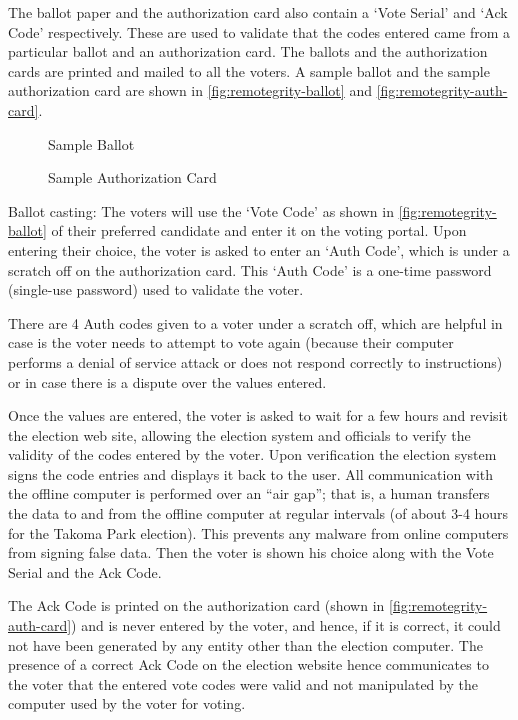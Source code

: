 The ballot paper and the authorization card also contain a `Vote
Serial' and `Ack Code' respectively. These are used to validate that
the codes entered came from a particular ballot and an authorization
card. The ballots and the authorization cards are printed and mailed
to all the voters. A sample ballot and the sample authorization card
are shown in \autoref{fig:remotegrity-ballot} and
\autoref{fig:remotegrity-auth-card}.

\begin{figure}
  \centering {}
  \caption{Sample Ballot}
  \label{fig:remotegrity-ballot}
\end{figure}

\begin{figure}
  \centering {}
  \caption{Sample Authorization Card}
  \label{fig:remotegrity-auth-card}
\end{figure}

Ballot casting: The voters will use the `Vote Code' as shown in
\autoref{fig:remotegrity-ballot} of their preferred candidate and
enter it on the voting portal. Upon entering their choice, the voter
is asked to enter an `Auth Code', which is under a scratch off on the
authorization card. This `Auth Code' is a one-time password
(single-use password) used to validate the voter.

There are 4 Auth codes given to a voter under a scratch off, which are
helpful in case is the voter needs to attempt to vote again (because
their computer performs a denial of service attack or does not respond
correctly to instructions) or in case there is a dispute over the
values entered.

Once the values are entered, the voter is asked to wait for a few
hours and revisit the election web site, allowing the election system
and officials to verify the validity of the codes entered by the
voter. Upon verification the election system signs the code entries
and displays it back to the user. All communication with the offline
computer is performed over an ``air gap''; that is, a human transfers
the data to and from the offline computer at regular intervals (of
about 3-4 hours for the Takoma Park election). This prevents any
malware from online computers from signing false data. Then the voter
is shown his choice along with the Vote Serial and the Ack Code.

The Ack Code is printed on the authorization card (shown in
\autoref{fig:remotegrity-auth-card}) and is never entered by the
voter, and hence, if it is correct, it could not have been generated
by any entity other than the election computer. The presence of a
correct Ack Code on the election website hence communicates to the
voter that the entered vote codes were valid and not manipulated by
the computer used by the voter for voting.

